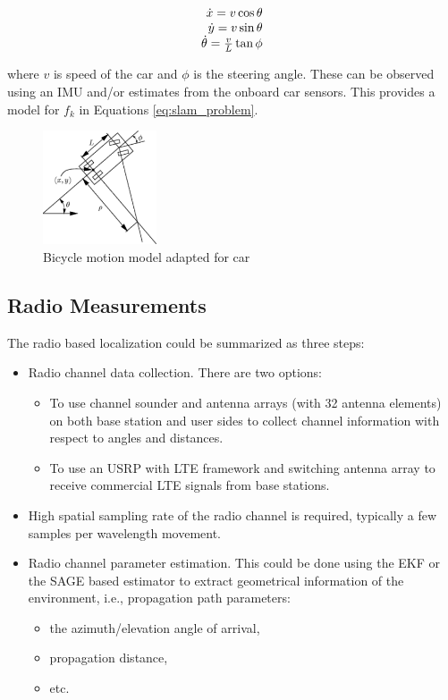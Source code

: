 \begin{equation}
 \begin{array}[b]{r}
  \dot{x}  = v \cos \theta \\
  \dot{y}  = v \sin \theta \\
  \dot{\theta}  = \frac{v}{L} \tan{\phi}
 \end{array}
\end{equation}

where $v$ is speed of the car and $\phi$ is the steering angle.
These can be observed using an \gls{IMU} and/or estimates from the onboard car
sensors. This provides a model for $f_k$ in Equations \eqref{eq:slam_problem}.

\begin{figure}
\centering
\label{fig:motion_model}
\includegraphics[width=0.3\textwidth]{figures/bicycle_model.pdf}
\caption{Bicycle motion model adapted for car}
\end{figure}


\subsection{Radio Measurements}\label{sec:radio_measurements}


The radio based localization could be summarized as three steps:

\begin{itemize}
\item Radio channel data collection. There are two options:
  \begin{itemize}
  \item To use channel sounder and antenna arrays (with 32 antenna
    elements) on both base station and user sides to collect channel
    information with respect to angles and distances.
  \item To use an \gls{USRP} with \gls{LTE} framework and switching antenna array to
  receive commercial \gls{LTE} signals from base stations.
\end{itemize}
\item  High spatial sampling rate of the radio channel is required, typically a few samples per wavelength movement.
\item Radio channel parameter estimation. This could be done using the \gls{EKF} or the
\gls{SAGE} based estimator
to extract geometrical information of the environment, i.e., propagation path
parameters:
\begin{itemize}
\item the azimuth/elevation angle of arrival,
\item propagation
distance,
\item etc.
\end{itemize}
\end{itemize}

